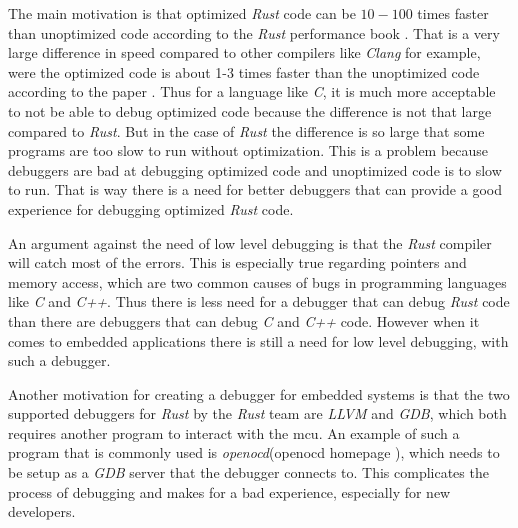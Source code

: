 


The main motivation is that optimized \emph{Rust} code can be $10-100$ times faster than unoptimized code according to the \emph{Rust} performance book \cite{perf-book}.
That is a very large difference in speed compared to other compilers like \emph{Clang} for example, were the optimized code is about 1-3 times faster than the unoptimized code according to the paper \cite{clang-opt}.
Thus for a language like \emph{C}, it is much more acceptable to not be able to debug optimized code because the difference is not that large compared to \emph{Rust}.
But in the case of \emph{Rust} the difference is so large that some programs are too slow to run without optimization.
This is a problem because debuggers are bad at debugging optimized code and unoptimized code is to slow to run.
That is way there is a need for better debuggers that can provide a good experience for debugging optimized \emph{Rust} code.


An argument against the need of low level debugging is that the \emph{Rust} compiler will catch most of the errors.
This is especially true regarding pointers and memory access, which are two common causes of bugs in programming languages like \emph{C} and \emph{C++}. 
Thus there is less need for a debugger that can debug \emph{Rust} code than there are debuggers that can debug \emph{C} and \emph{C++} code.
However when it comes to embedded applications there is still a need for low level debugging, with such a debugger.


Another motivation for creating a debugger for embedded systems is that the two supported debuggers for \emph{Rust} by the \emph{Rust} team are \emph{LLVM} and \emph{GDB}, which both requires another program to interact with the \gls{mcu}.
An example of such a program that is commonly used is \emph{openocd}(openocd homepage \cite{openocd}), which needs to be setup as a \emph{GDB} server that the debugger connects to.
This complicates the process of debugging and makes for a bad experience, especially for new developers.


